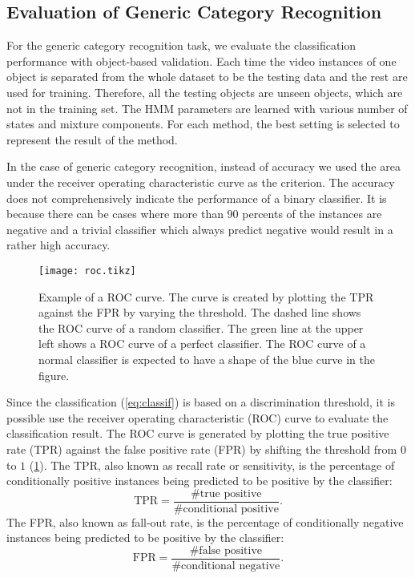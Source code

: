 \documentclass[12pt,final,twoside]{report}
\begin{document}
\subsection{Evaluation of Generic Category Recognition}
For the generic category recognition task, we evaluate the classification performance with object-based validation. Each time the video instances of one object is separated from the whole dataset to be the testing data and the rest are used for training. Therefore, all the testing objects are unseen objects, which are not in the training set. The HMM parameters are learned with various number of states and mixture components. For each method, the best setting is selected to represent the result of the method.

In the case of generic category recognition, instead of accuracy we used the area under the receiver operating characteristic curve as the criterion. The accuracy does not comprehensively indicate the performance of a binary classifier. It is because there can be cases where more than 90 percents of the instances are negative and a trivial classifier which always predict negative would result in a rather high accuracy.

\begin{figure}[t]
  \centering
  \texttt{[image: roc.tikz]}
  \caption[Example of a ROC curve.]{Example of a ROC curve. The curve is created by plotting the TPR against the FPR by varying the threshold. The dashed line shows the ROC curve of a random classifier. The green line at the upper left shows a ROC curve of a perfect classifier. The ROC curve of a normal classifier is expected to have a shape of the blue curve in the figure.}
  \label{fig:roc}
\end{figure}

Since the classification (\cref{eq:classif}) is based on a discrimination threshold, it is possible use the receiver operating characteristic (ROC) curve to evaluate the classification result. The ROC curve is generated by plotting the true positive rate (TPR) against the false positive rate (FPR) by shifting the threshold from $0$ to $1$ (\cref{fig:roc}). The TPR, also known as recall rate or sensitivity, is the percentage of conditionally positive instances being predicted to be positive by the classifier:
\[ \text{TPR} =  \frac{\text{\# true positive}}{\text{\# conditional positive}} . \]
The FPR, also known as fall-out rate, is the percentage of conditionally negative instances being predicted to be positive by the classifier:
\[ \text{FPR} =  \frac{\text{\# false positive}}{\text{\# conditional negative}} . \]
\end{document}
